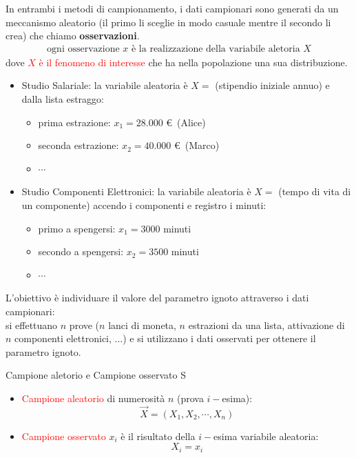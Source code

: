 \documentclass{article}  %
\theoremstyle{definition}
\begin{document}
In entrambi i metodi di campionamento, i dati campionari sono generati da un meccanismo aleatorio (il primo li sceglie in modo casuale mentre il secondo li crea) che chiamo
\textbf{osservazioni}.
\begin{align*}
	\text{ogni osservazione } x \text{ è la realizzazione della variabile aletoria } X
\end{align*}
dove \textcolor{red}{$X$ è il fenomeno di interesse} che ha nella popolazione una sua distribuzione.
\begin{esempio}
	\begin{itemize}
		\item Studio Salariale: la variabile aleatoria è $X = $ (stipendio iniziale annuo)
		      e dalla lista estraggo:
		      \begin{itemize}
			      \item prima estrazione: $x_1 = 28.000$ \euro \, (Alice)
			      \item seconda estrazione: $x_2 = 40.000$ \euro \, (Marco)
			      \item $\cdots$
		      \end{itemize}
		\item Studio Componenti Elettronici: la variabile aleatoria è $X = $ (tempo di vita di un componente) accendo i componenti e registro i minuti:
		      \begin{itemize}
			      \item primo a spengersi: $x_1 = 3000$ minuti
			      \item secondo a spengersi: $x_2 = 3500$ minuti
			      \item $\cdots$
		      \end{itemize}
	\end{itemize}
\end{esempio}
L'obiettivo è individuare il valore del parametro ignoto attraverso i dati campionari: \\
si effettuano $n$ prove ($n$ lanci di moneta, $n$ estrazioni da una lista, attivazione di $n$ componenti elettronici, ...)
e si utilizzano i dati osservati per ottenere il parametro ignoto.
\begin{theorem}{Campione aletorio e Campione osservato}
	S\begin{itemize}
		\item \textcolor{red}{Campione aleatorio} di numerosità $n$ (prova $i-$esima):
		      \[
			      \vec{X} = \left(X_1,X_2, \cdots, X_n \right)
		      \]
		\item \textcolor{red}{Campione osservato} $x_i$ è il risultato della $i-$esima variabile aleatoria:
		      \[
			      X_i = x_i
		      \]
	\end{itemize}
\end{theorem}
\end{document}
